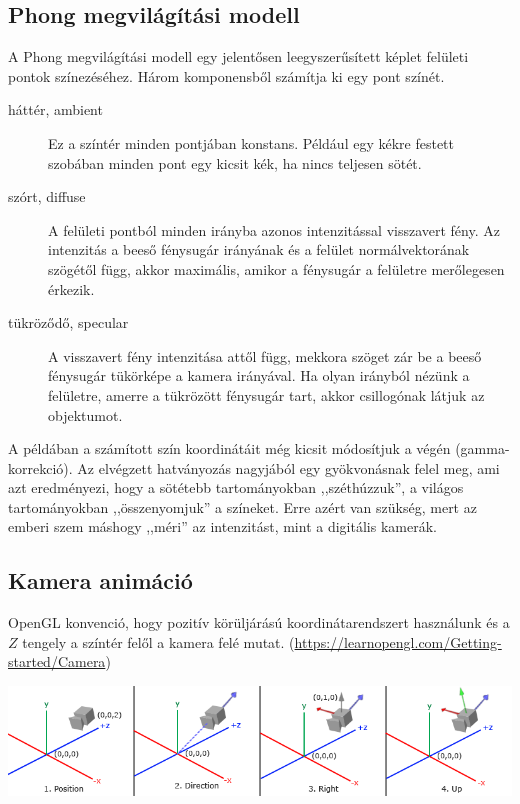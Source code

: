 \subsection{Phong megvilágítási modell}

A Phong megvilágítási modell egy jelentősen leegyszerűsített képlet felületi pontok
színezéséhez. Három komponensből számítja ki egy pont színét.

\begin{description}
  \item[háttér, ambient] Ez a színtér minden pontjában konstans. Például egy kékre festett szobában
  minden pont egy kicsit kék, ha nincs teljesen sötét.
  \item[szórt, diffuse] A felületi pontból minden irányba azonos intenzitással visszavert fény. Az
  intenzitás a beeső fénysugár irányának és a felület normálvektorának szögétől függ,
  akkor maximális, amikor a fénysugár a felületre merőlegesen érkezik.
  \item[tükröződő, specular] A visszavert fény intenzitása attől függ, mekkora szöget zár be
  a beeső fénysugár tükörképe a kamera irányával. Ha olyan irányból nézünk a felületre, amerre
  a tükrözött fénysugár tart, akkor csillogónak látjuk az objektumot.
\end{description} 


A példában a számított szín koordinátáit még kicsit módosítjuk a végén (gamma-korrekció).
Az elvégzett hatványozás nagyjából egy gyökvonásnak felel meg, ami azt eredményezi, hogy
a sötétebb tartományokban ,,széthúzzuk'', a világos tartományokban ,,összenyomjuk''
a színeket. Erre azért van szükség, mert az emberi szem máshogy ,,méri'' az intenzitást, mint
a digitális kamerák. 

\subsection{Kamera animáció}

OpenGL konvenció, hogy pozitív körüljárású koordinátarendszert használunk és a $Z$ tengely
a színtér felől a kamera felé mutat.
(\url{https://learnopengl.com/Getting-started/Camera})

\begin{center}
\includegraphics[width=16cm]{images/camera_axes.png}
\end{center}

